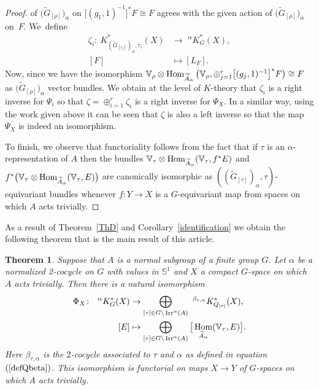 \documentclass[pdftex]{sigma}
\def\S{\mathbb{S}}
\def\V{\mathbb{V}}
\DeclareMathOperator{\Hom}{\textup{Hom}}
\DeclareMathOperator{\Irr}{\textup{Irr}}
\newtheorem{Th}{Theorem}[section]
\theoremstyle{definition}
\numberwithin{equation}{section}
\begin{document}
\begin{proof}
of $\big(\widetilde{G}_{[\rho]}\big)_{\alpha}$ on $\big[(g_{1},1)^{-1}\big]^{\ast} F\cong F$ agrees with
the given action of $\big(\widetilde{G}_{[\rho]}\big)_{\alpha}$ on~$F$. We~define
\begin{align*}
\zeta_{i}\colon\ K^{*}_{\left(\widetilde{G}_{[\tau_{i}]}\right)_{\alpha},\tau_{i}}(X)
&\rightarrow \phantom{i}^{\alpha}K_{G}^{\ast}(X),
\\
[F]&\mapsto [L_{F}].
\end{align*}
Now, since we have the isomorphism
$\V_{\rho}\otimes \Hom_{\widetilde{A}_{\alpha}}
\big(\V_{\rho},\oplus_{j=1}^{r}\big[(g_{j},1)^{-1}\big]^{\ast} F\big)\cong F$ as
$\big(\widetilde{G}_[\rho]\big)_{\alpha}$ vector bundles. We obtain at the level of $K$-theory that
$\zeta_{i}$ is a right inverse for $\Psi_{i}$ so that
$\zeta=\oplus_{i=1}^{r}\zeta_{i}$ is a right inverse for $\Psi_{X}$. In a similar way, using the
work given above it can be seen that $\zeta$ is also a left inverse so that the
map $\Psi_{X}$ is indeed an isomorphism.

To finish, we observe that functoriality follows from the fact that if $\tau$ is an
$\alpha$-representation of $A$ then the bundles
$\V_{\tau}\otimes \Hom_{\widetilde{A}_{\alpha}}(\V_{\tau},f^{\ast} E)$ and
$f^{\ast}\big(\V_{\tau}\otimes \Hom_{\widetilde{A}_{\alpha}}(\V_{\tau},E)\big)$
are canonically isomorphic as $((\widetilde{G}_{[\tau]})_{\alpha},\tau)$-equivariant bundles
whenever $f\colon Y\rightarrow X$ is a
$G$-equivariant map from spaces on which $A$ acts trivially.
\end{proof}


As a result of Theorem~\ref{ThD} and Corollary~\ref{identification} we obtain the following
theorem that is the main result of this article.

\begin{Th}\label{Thmain}
Suppose that $A$ is a normal subgroup of a finite group $G$. Let $\alpha$
be a normalized 2-cocycle on $G$ with values in $\S^{1}$ and $X$ a
compact $G$-space on which $A$ acts trivially.
Then there is a natural isomorphism
\begin{align*}
\Phi_{X}\colon\ \phantom{i}^{\alpha}K_{G}^{\ast}(X)&\rightarrow
\bigoplus_{[\tau]\in G\backslash \Irr^{\alpha}(A)}\phantom{i}
^{\beta_{\tau,\alpha}}K^{\ast}_{Q_{[\tau]}}(X),
\\
[E]&\mapsto \bigoplus_{[\tau]\in G\backslash \Irr^{\alpha}(A)}
\big[\Hom_{\widetilde{A}_{\alpha}}(\V_{\tau},E)\big].
\end{align*}
Here $\beta_{\tau,\alpha}$ is the $2$-cocycle associated to $\tau$ and $\alpha$ as defined in equation~$(\ref{defQbeta})$. This isomorphism is functorial on maps $X\rightarrow Y$ of
$G$-spaces on which $A$ acts trivially.
\end{Th}
\end{document}
